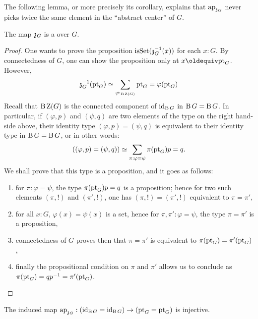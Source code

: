 The following lemma, or more precisely its corollary, explains that
$\mathop{\mathrm{ap}_{\mathfrak z_{{G}}}}$ never picks twice the same element in the
``abstract center'' of $G$.
\begin{lemma}
  \label{lemma:center-is-subgroup}%
  The map $\mathfrak z_{{G}}$ is a \covering over $G$. 
\end{lemma}
\begin{proof}
  One wants to prove the proposition
  $\mathrm{isSet}(\mathfrak z_{{G}}^{-1}(x))$ for each $x:G$. By connectedness
  of $G$, one can show the proposition only at $x\jdeq
  \pt_G$. However,
  \begin{displaymath}
    \mathfrak z_{{G}}^{-1}(\mathrm{pt}_G) \simeq \sum_{\varphi:_{\operatorname{B}\operatorname{Z}(G)}}{\mathrm{pt}_G = \varphi(\mathrm{pt}_G)}
  \end{displaymath}
  Recall that $\operatorname{B}\operatorname{Z}(G)$ is the connected component of
  $\mathord{\mathrm{id}}_{\operatorname{B} G}$ in $\operatorname{B} G = \operatorname{B} G$. In particular, if $(\varphi,p)$
  and $(\psi,q)$ are two elements of the type on the right hand-side
  above, their identity type $(\varphi,p)=(\psi,q)$ is equivalent to
  their identity type in $\operatorname{B} G = \operatorname{B} G$, or in other words:
  \begin{displaymath}
    ((\varphi,p) = (\psi,q)) \simeq \sum_{\pi:\varphi=\psi}\pi(\mathrm{pt}_G) p = q.
  \end{displaymath}
  We shall prove that this type is a proposition, and it goes as
  follows:
  \begin{enumerate}
  \item for $\pi:\varphi=\psi$, the type $\pi(\mathrm{pt}_G) p = q$ is a
    proposition; hence for two such elements $(\pi,!)$ and $(\pi',!)$,
    one has $(\pi,!)=(\pi',!)$ equivalent to $\pi=\pi'$,
  \item for all $x:G$, $\varphi(x)=\psi(x)$ is a set, hence for
    $\pi,\pi':\varphi=\psi$, the type $\pi=\pi'$ is a proposition,
  \item connectedness of $G$ proves then that $\pi=\pi'$ is equivalent
    to $\pi(\mathrm{pt}_G)=\pi'(\mathrm{pt}_G)$,
  \item finally the propositional condition on $\pi$ and $\pi'$ allows
    us to conclude as $\pi(\mathrm{pt}_G)= qp^{-1} = \pi'(\mathrm{pt}_G)$.
  \end{enumerate} 
\end{proof}

\begin{corollary}
  \label{lemma:center-inc-inj-on-paths}%
  The induced map
  $\mathop{\mathrm{ap}_{\mathfrak z_{{G}}}}: (\mathord{\mathrm{id}}_{\operatorname{B} G}=\mathord{\mathrm{id}}_{\operatorname{B} G}) \to (\mathrm{pt}_G = \mathrm{pt}_G)$ is
  injective.
\end{corollary}

